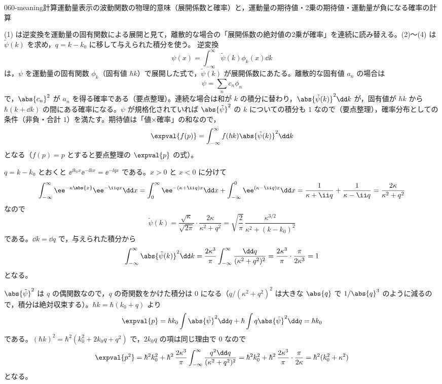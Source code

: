 \documentclass[uplatex,dvipdfmx,a4paper,11pt]{jsarticle}
\begin{document}
\begin{mondai}{060-meaning}{計算}{運動量表示の波動関数の物理的意味（展開係数と確率）と，運動量の期待値・2乗の期待値・運動量が負になる確率の計算}
\begin{kizuki}
\end{kizuki}
\begin{tadashii}
\houshin (1) は逆変換を運動量の固有関数による展開と見て，離散的な場合の「展開係数の絶対値の2乗が確率」を連続に読み替える。(2)〜(4) は $\tilde{\psi}(k)$ を求め，$q=k-k_{0}$ に移して与えられた積分を使う。
\keisan {} 逆変換
\[ \psi(x)=\int_{-\infty}^{\infty}\tilde{\psi}(k)\phi_{k}(x)\dd k \]
は，$\psi$ を運動量の固有関数 $\phi_{k}$（固有値 $\hbar k$）で展開した式で，$\tilde{\psi}(k)$ が展開係数にあたる。離散的な固有値 $a_{n}$ の場合は
\[ \psi=\sum_{n}c_{n}\phi_{n} \]
で，$\abs{c_{n}}^{2}$ が $a_{n}$ を得る確率である（要点整理）。連続な場合は和が $k$ の積分に替わり，$\abs{\tilde{\psi}(k)}^{2}\dd k$ が，固有値が $\hbar k$ から $\hbar(k+\dd k)$ の間にある確率になる。$\psi$ が規格化されていれば $\abs{\tilde{\psi}}^{2}$ の $k$ についての積分も $1$ なので（要点整理），確率分布としての条件（非負・合計 $1$）を満たす。期待値は「値×確率」の和なので，
\[ \expval{f(p)}=\int_{-\infty}^{\infty}f(\hbar k)\abs{\tilde{\psi}(k)}^{2}\dd k \]
となる（$f(p)=p$ とすると要点整理の $\expval{p}$ の式）。

 $q=k-k_{0}$ とおくと $\ee^{\ii k_{0}x}\ee^{-\ii kx}=\ee^{-\ii qx}$ である。$x>0$ と $x<0$ に分けて
\[ \int_{-\infty}^{\infty}\ee^{-\kappa\abs{x}}\ee^{-\ii qx}\dd x=\int_{0}^{\infty}\ee^{-(\kappa+\ii q)x}\dd x+\int_{-\infty}^{0}\ee^{(\kappa-\ii q)x}\dd x=\frac{1}{\kappa+\ii q}+\frac{1}{\kappa-\ii q}=\frac{2\kappa}{\kappa^{2}+q^{2}} \]
なので
\[ \tilde{\psi}(k)=\frac{\sqrt{\kappa}}{\sqrt{2\pi}}\cdot\frac{2\kappa}{\kappa^{2}+q^{2}}=\sqrt{\frac{2}{\pi}}\,\frac{\kappa^{3/2}}{\kappa^{2}+(k-k_{0})^{2}} \]
である。$\dd k=\dd q$ で，与えられた積分から
\[ \int_{-\infty}^{\infty}\abs{\tilde{\psi}(k)}^{2}\dd k=\frac{2\kappa^{3}}{\pi}\int_{-\infty}^{\infty}\frac{\dd q}{(\kappa^{2}+q^{2})^{2}}=\frac{2\kappa^{3}}{\pi}\cdot\frac{\pi}{2\kappa^{3}}=1 \]
となる。

 $\abs{\tilde{\psi}}^{2}$ は $q$ の偶関数なので，$q$ の奇関数をかけた積分は $0$ になる（$q/(\kappa^{2}+q^{2})^{2}$ は大きな $\abs{q}$ で $1/\abs{q}^{3}$ のように減るので，積分は絶対収束する）。$\hbar k=\hbar(k_{0}+q)$ より
\[ \expval{p}=\hbar k_{0}\int\abs{\tilde{\psi}}^{2}\dd q+\hbar\int q\abs{\tilde{\psi}}^{2}\dd q=\hbar k_{0} \]
である。$(\hbar k)^{2}=\hbar^{2}(k_{0}^{2}+2k_{0}q+q^{2})$ で，$2k_{0}q$ の項は同じ理由で $0$ なので
\[ \expval{p^{2}}=\hbar^{2}k_{0}^{2}+\hbar^{2}\,\frac{2\kappa^{3}}{\pi}\int_{-\infty}^{\infty}\frac{q^{2}\dd q}{(\kappa^{2}+q^{2})^{2}}=\hbar^{2}k_{0}^{2}+\hbar^{2}\,\frac{2\kappa^{3}}{\pi}\cdot\frac{\pi}{2\kappa}=\hbar^{2}(k_{0}^{2}+\kappa^{2}) \]
となる。


\end{tadashii}
\end{mondai}
\end{document}
